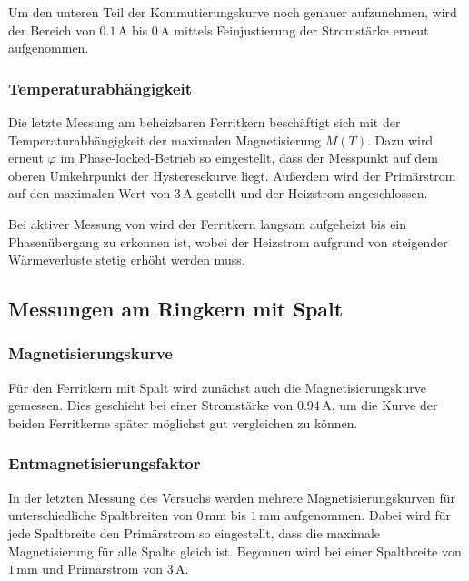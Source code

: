 \documentclass[12pt,a4paper]{scrartcl}
\numberwithin{equation}{section} %
\renewcommand{\[}{} %
\renewcommand{\]}{\noindent} %
\begin{document}
Um den unteren Teil der Kommutierungskurve noch genauer aufzunehmen,
wird der Bereich von \(0.1\,\mathrm A\) bis \(0\,\mathrm A\) mittels
Feinjustierung der Stromstärke erneut aufgenommen.

\hypertarget{temperaturabhuxe4ngigkeit-1}{%
\subsubsection{Temperaturabhängigkeit}\label{temperaturabhuxe4ngigkeit-1}}

Die letzte Messung am beheizbaren Ferritkern beschäftigt sich mit der
Temperaturabhängigkeit der maximalen Magnetisierung \(M(T)\). Dazu wird
erneut \(\varphi\) im Phase-locked-Betrieb so eingestellt, dass der
Messpunkt auf dem oberen Umkehrpunkt der Hysteresekurve liegt. Außerdem
wird der Primärstrom auf den maximalen Wert von \(3\,\mathrm A\)
gestellt und der Heizstrom angeschlossen.

Bei aktiver Messung von wird der Ferritkern langsam aufgeheizt bis ein
Phasenübergang zu erkennen ist, wobei der Heizstrom aufgrund von
steigender Wärmeverluste stetig erhöht werden muss.

\hypertarget{messungen-am-ringkern-mit-spalt}{%
\subsection{Messungen am Ringkern mit
Spalt}\label{messungen-am-ringkern-mit-spalt}}

\hypertarget{magnetisierungskurve-1}{%
\subsubsection{Magnetisierungskurve}\label{magnetisierungskurve-1}}

Für den Ferritkern mit Spalt wird zunächst auch die Magnetisierungskurve
gemessen. Dies geschieht bei einer Stromstärke von \(0.94\,\mathrm A\),
um die Kurve der beiden Ferritkerne später möglichst gut vergleichen zu
können.

\hypertarget{entmagnetisierungsfaktor-1}{%
\subsubsection{Entmagnetisierungsfaktor}\label{entmagnetisierungsfaktor-1}}

In der letzten Messung des Versuchs werden mehrere Magnetisierungskurven
für unterschiedliche Spaltbreiten von \(0\,\mathrm{mm}\) bis
\(1\,\mathrm{mm}\) aufgenommen. Dabei wird für jede Spaltbreite den
Primärstrom so eingestellt, dass die maximale Magnetisierung für alle
Spalte gleich ist. Begonnen wird bei einer Spaltbreite von
\(1\,\mathrm{mm}\) und Primärstrom von \(3\,\mathrm A\).
\end{document}
